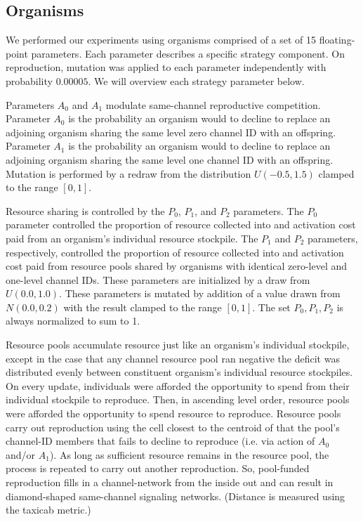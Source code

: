 \subsection{Organisms}

We performed our experiments using organisms comprised of a set of 15 floating-point parameters.
Each parameter describes a specific strategy component.
On reproduction, mutation was applied to each parameter independently with probability $0.00005$.
We will overview each strategy parameter below.

Parameters $A_0$ and $A_1$ modulate same-channel reproductive competition.
Parameter $A_0$ is the probability an organism would to decline to replace an adjoining organism sharing the same level zero channel ID with an offspring.
Parameter $A_1$ is the probability an organism would to decline to replace an adjoining organism sharing the same level one channel ID with an offspring.
Mutation is performed by a redraw from the distribution $U(-0.5,1.5)$ clamped to the range $[0,1]$.

Resource sharing is controlled by the $P_0$, $P_1$, and $P_2$ parameters.
The $P_0$ parameter controlled the proportion of resource collected into and activation cost paid from an organism's individual resource stockpile.
The $P_1$ and $P_2$ parameters, respectively, controlled the proportion of resource collected into and activation cost paid from resource pools shared by organisms with identical zero-level and one-level channel IDs.
These parameters are initialized by a draw from $U(0.0, 1.0)$.
These parameters is mutated by addition of a value drawn from $N(0.0,0.2)$ with the result clamped to the range $[0,1]$.
The set $P_0, P_1, P_2$ is always normalized to sum to 1.

Resource pools accumulate resource just like an organism's individual stockpile, except in the case that any channel resource pool ran negative the deficit was distributed evenly between constituent organism's individual resource stockpiles.
On every update, individuals were afforded the opportunity to spend from their individual stockpile to reproduce.
Then, in ascending level order, resource pools were afforded the opportunity to spend resource to reproduce.
Resource pools carry out reproduction using the cell closest to the centroid of that the pool's channel-ID members that fails to decline to reproduce (i.e. via action of $A_0$ and/or $A_1$).
As long as sufficient resource remains in the resource pool, the process is repeated to carry out another reproduction.
So, pool-funded reproduction fills in a channel-network from the inside out and can result in diamond-shaped same-channel signaling networks.
(Distance is measured using the taxicab metric.)

